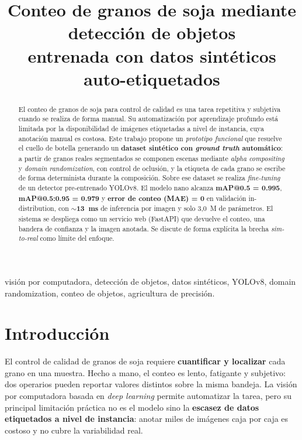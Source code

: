 \documentclass[conference]{IEEEtran}
\begin{document}
\title{Conteo de granos de soja mediante detección de objetos\\
entrenada con datos sintéticos auto-etiquetados}

\author{
}

\maketitle

\begin{abstract}
El conteo de granos de soja para control de calidad es una tarea repetitiva y
subjetiva cuando se realiza de forma manual. Su automatización por aprendizaje
profundo está limitada por la disponibilidad de imágenes etiquetadas a nivel de
instancia, cuya anotación manual es costosa. Este trabajo propone un
\textit{prototipo funcional} que resuelve el cuello de botella generando un
\textbf{dataset sintético con \emph{ground truth} automático}: a partir de granos
reales segmentados se componen escenas mediante \textit{alpha compositing} y
\textit{domain randomization}, con control de oclusión, y la etiqueta de cada
grano se escribe de forma determinista durante la composición. Sobre ese dataset
se realiza \textit{fine-tuning} de un detector pre-entrenado YOLOv8. El modelo
nano alcanza \textbf{mAP@0.5 = 0.995}, \textbf{mAP@0.5:0.95 = 0.979} y
\textbf{error de conteo (MAE) = 0} en validación in-distribution, con
\textbf{$\sim$13~ms} de inferencia por imagen y solo 3{,}0~M de parámetros. El
sistema se despliega como un servicio web (FastAPI) que devuelve el conteo, una
bandera de confianza y la imagen anotada. Se discute de forma explícita la brecha
\textit{sim-to-real} como límite del enfoque.
\end{abstract}

\begin{IEEEkeywords}
visión por computadora, detección de objetos, datos sintéticos, YOLOv8,
domain randomization, conteo de objetos, agricultura de precisión.
\end{IEEEkeywords}

\section{Introducción}
El control de calidad de granos de soja requiere \textbf{cuantificar y localizar}
cada grano en una muestra. Hecho a mano, el conteo es lento, fatigante y
subjetivo: dos operarios pueden reportar valores distintos sobre la misma bandeja.
La visión por computadora basada en \textit{deep learning} permite automatizar la
tarea, pero su principal limitación práctica no es el modelo sino la
\textbf{escasez de datos etiquetados a nivel de instancia}: anotar miles de
imágenes caja por caja es costoso y no cubre la variabilidad real.
\end{document}
